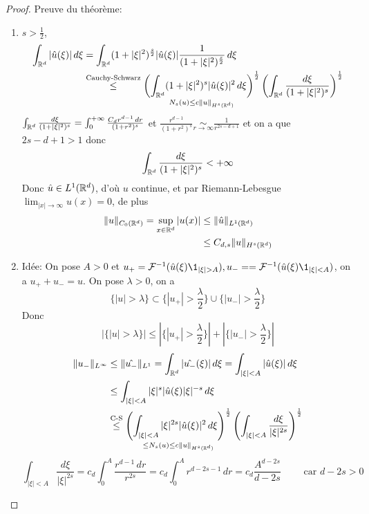 \documentclass[]{report}
\begin{document}
    \begin{proof}
        Preuve du théorème: \begin{enumerate}
            \item $s>\frac{1}{2}$,
            \begin{align*}
                \int_{\mathbb{R}^d}|\hat{u}(\xi)|\, d\xi&=\int_{\mathbb{R}^d}(1+|\xi|^2)^{\frac{s}{2}}|\hat{u}(\xi)|\frac{1}{(1+|\xi|^2)^{\frac{s}{2}}}\, d\xi\\
                &\overset{\text{Cauchy-Schwarz}}{\le}\underset{N_s(u)\le c\lVert u \rVert_{H^s(\mathbb{R}^d)}}{\left(\int_{\mathbb{R}^d}(1+|\xi|^2)^s|\hat{u}(\xi)|^2\, d\xi\right)^{\frac{1}{2}}}\left(\int_{\mathbb{R}^d}\frac{d\xi}{(1+|\xi|^2)^s}\right)^{\frac{1}{2}}
            \end{align*}
            $\int_{\mathbb{R}^d}\frac{d\xi}{(1+|\xi|^2)^s}=\int_{0}^{+\infty}\frac{C_d r^{d-1}\, dr}{(1+r^2)^s}$ et $\frac{r^{d-1}}{(1+r^2)^s}\underset{r\to \infty}{\sim}\frac{1}{r^{2s-d+1}}$ et on a que $2s-d+1>1$ donc
            \[\int_{\mathbb{R}^d}\frac{d\xi}{(1+|\xi|^2)^s}<+\infty\]
            Donc $\hat{u}\in L^1(\mathbb{R}^d)$, d'où $u$ continue, et par Riemann-Lebesgue $\lim_{|x|\to \infty}u(x)=0$, de plus
            \begin{align*}
                \lVert u \rVert_{C_0(\mathbb{R}^d)}=\sup_{x\in \mathbb{R}^d}|u(x)|&\le \lVert \hat{u} \rVert_{L^1(\mathbb{R}^d)}\\
                &\le C_{d,s}\lVert u \rVert_{H^s(\mathbb{R}^d)}
            \end{align*}
            \item Idée: On pose $A>0$ et $u_+=\Fr^{-1}(\hat{u}(\xi)\1_{|\xi|>A}),u_-==\Fr^{-1}(\hat{u}(\xi)\1_{|\xi|<A})$, on a $u_+ +u_-=u$. On pose $\lambda >0$, on a
            \[\{|u|>\lambda\}\subset \{|u_+|>\frac{\lambda}{2}\}\cup \{|u_-|>\frac{\lambda}{2}\}\]
            Donc
            \[|\{|u|>\lambda\}|\le \left|\{|u_+|>\frac{\lambda}{2}\}\right|+ \left|\{|u_-|>\frac{\lambda}{2}\}\right|\]
            \begin{align*}
                \lVert u_- \rVert_{L^\infty}&\le \lVert \hat{u_-} \rVert_{L^1}=\int_{\mathbb{R}^d}|\hat{u_-}(\xi)|\, d\xi=\int_{|\xi|<A}|\hat{u}(\xi)|\, d\xi\\
                &\le \int_{|\xi|<A}|\xi|^s|\hat{u}(\xi)|\xi|^{-s}\, d\xi\\
                &\overset{\text{C-S}}{\le}\underset{\le N_s(u)\le c\lVert u \rVert_{H^s(\mathbb{R}^d)}}{\left(\int_{|\xi|<A}|\xi|^{2s}|\hat{u}(\xi)|^2\, d\xi\right)^{\frac{1}{2}}} \left(\int_{|\xi|<A}\frac{d\xi}{|\xi|^{2s}}\right)^{\frac{1}{2}}
            \end{align*}
            \[\int_{|\xi|<A}\frac{d\xi}{|\xi|^{2s}}=c_d\int_{0}^{A}\frac{r^{d-1}\, dr}{r^{2s}}=c_d\int_{0}^{A}r^{d-2s-1}\, dr=c_d\frac{A^{d-2s}}{d-2s}\qquad \text{ car $d-2s>0$}\]

\end{enumerate}
\end{proof}
\end{document}

